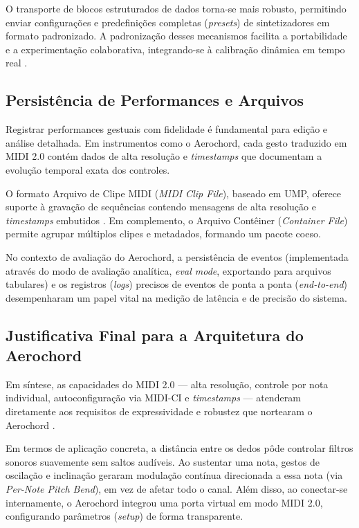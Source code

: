 O transporte de blocos estruturados de dados torna-se mais robusto, permitindo enviar configurações e predefinições completas (\textit{presets}) de sintetizadores em formato padronizado. A padronização desses mecanismos facilita a portabilidade e a experimentação colaborativa, integrando-se à calibração dinâmica em tempo real \cite{MIDIPropertyExchange2023}. 

\subsection{Persistência de Performances e Arquivos}
Registrar performances gestuais com fidelidade é fundamental para edição e análise detalhada. Em instrumentos como o Aerochord, cada gesto traduzido em MIDI 2.0 contém dados de alta resolução e \textit{timestamps} que documentam a evolução temporal exata dos controles.

O formato Arquivo de Clipe MIDI (\textit{MIDI Clip File}), baseado em UMP, oferece suporte à gravação de sequências contendo mensagens de alta resolução e \textit{timestamps} embutidos \cite{MIDIClipFile2023}. Em complemento, o Arquivo Contêiner (\textit{Container File}) permite agrupar múltiplos clipes e metadados, formando um pacote coeso. 

No contexto de avaliação do Aerochord, a persistência de eventos (implementada através do modo de avaliação analítica, \textit{eval mode}, exportando para arquivos tabulares) e os registros (\textit{logs}) precisos de eventos de ponta a ponta (\textit{end-to-end}) desempenharam um papel vital na medição de latência e de precisão do sistema.

\subsection{Justificativa Final para a Arquitetura do Aerochord}
Em síntese, as capacidades do MIDI 2.0 — alta resolução, controle por nota individual, autoconfiguração via MIDI-CI e \textit{timestamps} — atenderam diretamente aos requisitos de expressividade e robustez que nortearam o Aerochord \cite{UMPProtocol2023,MIDICI2023,MIDIPropertyExchange2023,MIDIClipFile2023}.

Em termos de aplicação concreta, a distância entre os dedos pôde controlar filtros sonoros suavemente sem saltos audíveis. Ao sustentar uma nota, gestos de oscilação e inclinação geraram modulação contínua direcionada a essa nota (via \textit{Per-Note Pitch Bend}), em vez de afetar todo o canal. Além disso, ao conectar-se internamente, o Aerochord integrou uma porta virtual em modo MIDI 2.0, configurando parâmetros (\textit{setup}) de forma transparente.

